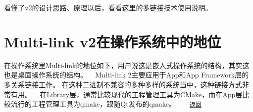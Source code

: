 看懂了v2的设计思路、原理以后，看看这里的多链接技术使用说明。 ~\newline
  ~\newline
 \section*{Multi-\/link v2在操作系统中的地位}

在操作系统里\+Multi-\/link的地位如下，用户说这是嵌入式操作系统的结构，其实这也是桌面操作系统的结构。 ~\newline
Multi-\/link 2主要应用于\+App和\+App Framework层的多关系链接工作。 在这种二进制不兼容的多种多样的系统当中，这种链接方式非常有用。 ~\newline
在\+Library层，通常比较现代的工程管理工具为\+C\+Make，而在\+App层比较流行的工程管理工具为qmake，跟随\+Qt发布的qmake。 ~\newline
  ~\newline
 \href{.}{\tt 返回} 